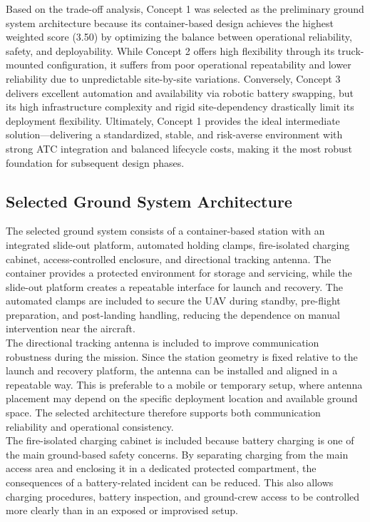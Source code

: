 Based on the trade-off analysis, Concept 1 was selected as the preliminary ground system architecture because its container-based design achieves the highest weighted score (3.50) by optimizing the balance between operational reliability, safety, and deployability. While Concept 2 offers high flexibility through its truck-mounted configuration, it suffers from poor operational repeatability and lower reliability due to unpredictable site-by-site variations. Conversely, Concept 3 delivers excellent automation and availability via robotic battery swapping, but its high infrastructure complexity and rigid site-dependency drastically limit its deployment flexibility. Ultimately, Concept 1 provides the ideal intermediate solution—delivering a standardized, stable, and risk-averse environment with strong ATC integration and balanced lifecycle costs, making it the most robust foundation for subsequent design phases.


\subsection{Selected Ground System Architecture}

The selected ground system consists of a container-based station with an integrated slide-out platform, automated holding clamps, fire-isolated charging cabinet, access-controlled enclosure, and directional tracking antenna. The container provides a protected environment for storage and servicing, while the slide-out platform creates a repeatable interface for launch and recovery. The automated clamps are included to secure the UAV during standby, pre-flight preparation, and post-landing handling, reducing the dependence on manual intervention near the aircraft.
\\
The directional tracking antenna is included to improve communication robustness during the mission. Since the station geometry is fixed relative to the launch and recovery platform, the antenna can be installed and aligned in a repeatable way. This is preferable to a mobile or temporary setup, where antenna placement may depend on the specific deployment location and available ground space. The selected architecture therefore supports both communication reliability and operational consistency.
\\
The fire-isolated charging cabinet is included because battery charging is one of the main ground-based safety concerns. By separating charging from the main access area and enclosing it in a dedicated protected compartment, the consequences of a battery-related incident can be reduced. This also allows charging procedures, battery inspection, and ground-crew access to be controlled more clearly than in an exposed or improvised setup.





